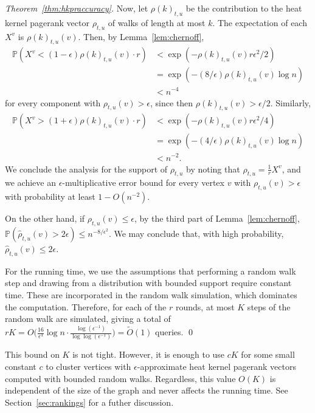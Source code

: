 \documentclass[runningheads,a4paper]{llncs}
\renewcommand{\P}{\mathbb{P}}
\newcommand{\rparam}{\frac{16}{\epsilon^3}\log n}
\newcommand{\kparam}{\frac{\log(\epsilon^{-1})}{\log\log(\epsilon^{-1})}}
\begin{document}
\begin{proof}[Theorem~\ref{thm:hkpraccuracy}]
Now, let $\rho(k)_{t,u}$ be the contribution to the heat kernel pagerank vector
$\rho_{t,u}$ of walks of length at most $k$.  The expectation of each $X^v$ is
$\rho(k)_{t,u}(v)$.  Then, by Lemma~\ref{lem:chernoff},
\begin{align*}
\P(X^v < (1-\epsilon) \rho(k)_{t,u}(v)\cdot r) &< \exp(-\rho(k)_{t,u}(v)r\epsilon^2/2)\\
&= \exp(-(8/\epsilon)\rho(k)_{t,u}(v)\log n)\\
&< n^{-4}
\end{align*}
for every component with $\rho_{t,u}(v) > \epsilon$, since then $\rho(k)_{t,u}(v) >
\epsilon/2$.  Similarly,
\begin{align*}
\P(X^v > (1+\epsilon) \rho(k)_{t,u}(v)\cdot r) &< \exp(-\rho(k)_{t,u}(v)r\epsilon^2/4)\\
&= \exp(-(4/\epsilon)\rho(k)_{t,u}(v)\log n)\\
&< n^{-2}.
\end{align*}
We conclude the analysis for the support of $\rho_{t,u}$ by noting that $\hat{\rho}_{t,u}
= \frac{1}{r} X^v$, and we achieve an $\epsilon$-multiplicative error bound for
every vertex $v$ with $\rho_{t,u}(v) > \epsilon$ with probability at least
$1-O(n^{-2})$.

On the other hand, if $\rho_{t,u}(v)\leq\epsilon$, by the third part of
Lemma~\ref{lem:chernoff}, $\P(\hat{\rho}_{t,u}(v) > 2\epsilon) \leq
n^{-8/\epsilon^2}$.  We may conclude that, with high probability, $\hat{\rho}_{t,u}(v)
\leq 2\epsilon$.

For the running time, we use the assumptions that performing a random walk step
and drawing from a distribution with bounded support require constant time.
These are incorporated in the random walk simulation, which dominates the
computation.  Therefore, for each of the $r$ rounds, at most $K$ steps of the
random walk are simulated, giving a total of $rK =  O\Big(\rparam \cdot
\kparam\Big)= \tilde {O}(1)$ queries.
\qed\end{proof}

\begin{remark}
This bound on $K$ is not tight.  However, it is enough to use $cK$ for some
small constant $c$ to cluster vertices with $\epsilon$-approximate heat kernel
pagerank vectors computed with bounded random walks.  Regardless, this value
$O(K)$ is independent of the size of the graph and never affects the running
time.  See Section~\ref{sec:rankings} for a futher discussion.
\end{remark}
\end{document}
